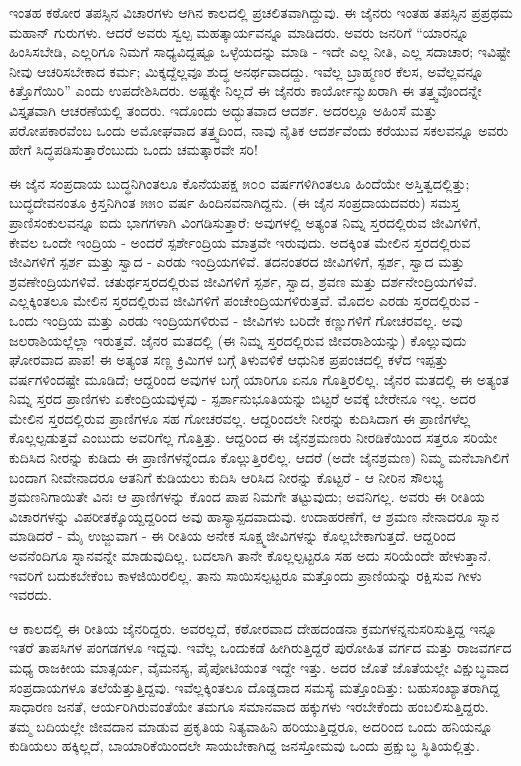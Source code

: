ಇಂತಹ ಕಠೋರ ತಪಸ್ಸಿನ ವಿಚಾರಗಳು ಆಗಿನ ಕಾಲದಲ್ಲಿ ಪ್ರಚಲಿತವಾಗಿದ್ದುವು. ಈ ಜೈನರು ಇಂತಹ ತಪಸ್ಸಿನ ಪ್ರಪ್ರಥಮ ಮಹಾನ್ ಗುರುಗಳು. ಆದರೆ ಅವರು ಸ್ವಲ್ಪ ಮಹತ್ಕಾರ್ಯವನ್ನೂ ಮಾಡಿದರು. ಅವರು ಜನರಿಗೆ “ಯಾರನ್ನೂ ಹಿಂಸಿಸಬೇಡಿ, ಎಲ್ಲರಿಗೂ ನಿಮಗೆ ಸಾಧ್ಯವಿದ್ದಷ್ಟೂ ಒಳ್ಳೆಯದನ್ನು ಮಾಡಿ - ಇದೇ ಎಲ್ಲ ನೀತಿ, ಎಲ್ಲ ಸದಾಚಾರ; ಇವಿಷ್ಟೇ ನೀವು ಆಚರಿಸಬೇಕಾದ ಕರ್ಮ; ಮಿಕ್ಕದ್ದೆಲ್ಲವೂ ಶುದ್ಧ ಅನರ್ಥವಾದದ್ದು. ಇವೆಲ್ಲ ಬ್ರಾಹ್ಮಣರ ಕೆಲಸ, ಅವೆಲ್ಲವನ್ನೂ ಕಿತ್ತೊಗೆಯಿರಿ” ಎಂದು ಉಪದೇಶಿಸಿದರು. ಅಷ್ಟಕ್ಕೇ ನಿಲ್ಲದೆ ಈ ಜೈನರು ಕಾರ್ಯೋನ್ಮುಖರಾಗಿ ಈ ತತ್ತ್ವವೊಂದನ್ನೇ ವಿಸ್ತೃತವಾಗಿ ಆಚರಣೆಯಲ್ಲಿ ತಂದರು. ಇದೊಂದು ಅದ್ಭುತವಾದ ಆದರ್ಶ. ಅದರಲ್ಲೂ ಅಹಿಂಸೆ ಮತ್ತು ಪರೋಪಕಾರವೆಂಬ ಒಂದು ಅಮೋಘವಾದ ತತ್ತ್ವದಿಂದ, ನಾವು ನೈತಿಕ ಆದರ್ಶವೆಂದು ಕರೆಯುವ ಸಕಲವನ್ನೂ ಅವರು ಹೇಗೆ ಸಿದ್ಧಪಡಿಸುತ್ತಾರೆಂಬುದು ಒಂದು ಚಮತ್ಕಾರವೇ ಸರಿ!

ಈ ಜೈನ ಸಂಪ್ರದಾಯ ಬುದ್ಧನಿಗಿಂತಲೂ ಕೊನೆಯಪಕ್ಷ ೫೦೦ ವರ್ಷಗಳಿಗಿಂತಲೂ ಹಿಂದೆಯೇ ಅಸ್ತಿತ್ವದಲ್ಲಿತ್ತು; ಬುದ್ಧದೇವನಂತೂ ಕ್ರಿಸ್ತನಿಗಿಂತ ೫೫೦ ವರ್ಷ ಹಿಂದಿನವನಾಗಿದ್ದನು. (ಈ ಜೈನ ಸಂಪ್ರದಾಯದವರು) ಸಮಸ್ತ ಪ್ರಾಣಿಸಂಕುಲವನ್ನೂ ಐದು ಭಾಗಗಳಾಗಿ ವಿಂಗಡಿಸುತ್ತಾರೆ: ಅವುಗಳಲ್ಲಿ ಅತ್ಯಂತ ನಿಮ್ನ ಸ್ತರದಲ್ಲಿರುವ ಜೀವಿಗಳಿಗೆ, ಕೇವಲ ಒಂದೇ ಇಂದ್ರಿಯ - ಅಂದರೆ ಸ್ಪರ್ಶೇಂದ್ರಿಯ ಮಾತ್ರವೇ ಇರುವುದು. ಅದಕ್ಕಿಂತ ಮೇಲಿನ ಸ್ತರದಲ್ಲಿರುವ ಜೀವಿಗಳಿಗೆ ಸ್ಪರ್ಶ ಮತ್ತು ಸ್ವಾದ - ಎರಡು ಇಂದ್ರಿಯಗಳಿವೆ. ತದನಂತರದ ಜೀವಿಗಳಿಗೆ, ಸ್ಪರ್ಶ, ಸ್ವಾದ ಮತ್ತು ಶ್ರವಣೇಂದ್ರಿಯಗಳಿವೆ. ಚತುರ್ಥಸ್ತರದಲ್ಲಿರುವ ಜೀವಿಗಳಿಗೆ ಸ್ಪರ್ಶ, ಸ್ವಾದ, ಶ್ರವಣ ಮತ್ತು ದರ್ಶನೇಂದ್ರಿಯಗಳಿವೆ. ಎಲ್ಲಕ್ಕಿಂತಲೂ ಮೇಲಿನ ಸ್ತರದಲ್ಲಿರುವ ಜೀವಿಗಳಿಗೆ ಪಂಚೇಂದ್ರಿಯಗಳಿರುತ್ತವೆ. ಮೊದಲ ಎರಡು ಸ್ತರದಲ್ಲಿರುವ - ಒಂದು ಇಂದ್ರಿಯ ಮತ್ತು ಎರಡು ಇಂದ್ರಿಯಗಳಿರುವ - ಜೀವಿಗಳು ಬರಿದೇ ಕಣ್ಣುಗಳಿಗೆ ಗೋಚರವಲ್ಲ. ಅವು ಜಲರಾಶಿಯಲ್ಲೆಲ್ಲಾ ಇರುತ್ತವೆ. ಜೈನರ ಮತದಲ್ಲಿ (ಈ ನಿಮ್ನ ಸ್ತರದಲ್ಲಿರುವ ಜೀವರಾಶಿಯನ್ನು) ಕೊಲ್ಲುವುದು ಘೋರವಾದ ಪಾಪ! ಈ ಅತ್ಯಂತ ಸಣ್ಣ ಕ್ರಿಮಿಗಳ ಬಗ್ಗೆ ತಿಳುವಳಿಕೆ ಆಧುನಿಕ ಪ್ರಪಂಚದಲ್ಲಿ ಕಳೆದ ಇಪ್ಪತ್ತು ವರ್ಷಗಳಿಂದಷ್ಟೇ ಮೂಡಿದೆ; ಆದ್ದರಿಂದ ಅವುಗಳ ಬಗ್ಗೆ ಯಾರಿಗೂ ಏನೂ ಗೊತ್ತಿರಲಿಲ್ಲ. ಜೈನರ ಮತದಲ್ಲಿ ಈ ಅತ್ಯಂತ ನಿಮ್ನ ಸ್ತರದ ಪ್ರಾಣಿಗಳು ಏಕೇಂದ್ರಿಯವುಳ್ಳವು - ಸ್ಪರ್ಶಾನುಭೂತಿಯನ್ನು ಬಿಟ್ಟರೆ ಅವಕ್ಕೆ ಬೇರೇನೂ ಇಲ್ಲ. ಅದರ ಮೇಲಿನ ಸ್ತರದಲ್ಲಿರುವ ಪ್ರಾಣಿಗಳೂ ಸಹ ಗೋಚರವಲ್ಲ. ಆದ್ದರಿಂದಲೇ ನೀರನ್ನು ಕುದಿಸಿದಾಗ ಈ ಪ್ರಾಣಿಗಳೆಲ್ಲ ಕೊಲ್ಲಲ್ಪಡುತ್ತವೆ ಎಂಬುದು ಅವರಿಗೆಲ್ಲ ಗೊತ್ತಿತ್ತು. ಆದ್ದರಿಂದ ಈ ಜೈನಶ್ರಮಣರು ನೀರಡಿಕೆಯಿಂದ ಸತ್ತರೂ ಸರಿಯೇ ಕುದಿಸಿದ ನೀರನ್ನು ಕುಡಿದು ಈ ಪ್ರಾಣಿಗಳನ್ನೆಂದೂ ಕೊಲ್ಲುತ್ತಿರಲಿಲ್ಲ. ಆದರೆ (ಅದೇ ಜೈನಶ್ರಮಣ) ನಿಮ್ಮ ಮನೆಬಾಗಿಲಿಗೆ ಬಂದಾಗ ನೀವೇನಾದರೂ ಆತನಿಗೆ ಕುಡಿಯಲು ಕುದಿಸಿ ಆರಿಸಿದ ನೀರನ್ನು ಕೊಟ್ಟರೆ - ಆ ನೀರಿನ ಸೌಲಭ್ಯ ಶ್ರಮಣನಿಗಾಯಿತೇ ವಿನಃ ಆ ಪ್ರಾಣಿಗಳನ್ನು ಕೊಂದ ಪಾಪ ನಿಮಗೇ ತಟ್ಟುವುದು; ಅವನಿಗಲ್ಲ. ಅವರು ಈ ರೀತಿಯ ವಿಚಾರಗಳನ್ನು ವಿಪರೀತಕ್ಕೊಯ್ದದ್ದರಿಂದ ಅವು ಹಾಸ್ಯಾಸ್ಪದವಾದುವು. ಉದಾಹರಣೆಗೆ, ಆ ಶ್ರಮಣ ನೇನಾದರೂ ಸ್ನಾನ ಮಾಡಿದರೆ - ಮೈ ಉಜ್ಜುವಾಗ - ಈ ರೀತಿಯ ಅನೇಕ ಸೂಕ್ಷ್ಮಜೀವಿಗಳನ್ನು ಕೊಲ್ಲಬೇಕಾಗುತ್ತದೆ. ಆದ್ದರಿಂದ ಅವನೆಂದಿಗೂ ಸ್ನಾನವನ್ನೇ ಮಾಡುವುದಿಲ್ಲ. ಬದಲಾಗಿ ತಾನೇ ಕೊಲ್ಲಲ್ಪಟ್ಟರೂ ಸಹ ಅದು ಸರಿಯೆಂದೇ ಹೇಳುತ್ತಾನೆ. ಇವರಿಗೆ ಬದುಕಬೇಕೆಂಬ ಕಾಳಜಿಯಿರಲಿಲ್ಲ. ತಾನು ಸಾಯಿಸಲ್ಪಟ್ಟರೂ ಮತ್ತೊಂದು ಪ್ರಾಣಿಯನ್ನು ರಕ್ಷಿಸುವ ಗೀಳು ಇವರದು.

ಆ ಕಾಲದಲ್ಲಿ ಈ ರೀತಿಯ ಜೈನರಿದ್ದರು. ಅವರಲ್ಲದೆ, ಕಠೋರವಾದ ದೇಹದಂಡನಾ ಕ್ರಮಗಳನ್ನನುಸರಿಸುತ್ತಿದ್ದ ಇನ್ನೂ ಇತರೆ ತಾಪಸಿಗಳ ಪಂಗಡಗಳೂ ಇದ್ದವು. ಇವೆಲ್ಲ ಒಂದುಕಡೆ ಹೀಗಿರುತ್ತಿದ್ದರೆ ಪುರೋಹಿತ ವರ್ಗದ ಮತ್ತು ರಾಜವರ್ಗದ ಮಧ್ಯ ರಾಜಕೀಯ ಮಾತ್ಸರ್ಯ, ವೈಮನಸ್ಯ, ಪೈಪೋಟಿಯಂತ ಇದ್ದೇ ಇತ್ತು. ಅದರ ಜೊತೆ ಜೊತೆಯಲ್ಲೇ ವಿಕ್ಷುಬ್ಧವಾದ ಸಂಪ್ರದಾಯಗಳೂ ತಲೆಯೆತ್ತುತ್ತಿದ್ದವು. ಇವೆಲ್ಲಕ್ಕಿಂತಲೂ ದೊಡ್ಡದಾದ ಸಮಸ್ಯೆ ಮತ್ತೊಂದಿತ್ತು: ಬಹುಸಂಖ್ಯಾತರಾಗಿದ್ದ ಸಾಧಾರಣ ಜನತೆ, ಆರ್ಯರಿಗಿರುವಂತೆಯೇ ತಮಗೂ ಸಮಾನವಾದ ಹಕ್ಕುಗಳು ಇರಬೇಕೆಂದು ಹಂಬಲಿಸುತ್ತಿದ್ದರು. ತಮ್ಮ ಬದಿಯಲ್ಲೇ ಜೀವದಾನ ಮಾಡುವ ಪ್ರಕೃತಿಯ ನಿತ್ಯವಾಹಿನಿ ಹರಿಯುತ್ತಿದ್ದರೂ, ಅದರಿಂದ ಒಂದು ಹನಿಯನ್ನೂ ಕುಡಿಯಲು ಹಕ್ಕಿಲ್ಲದೆ, ಬಾಯಾರಿಕೆಯಿಂದಲೇ ಸಾಯಬೇಕಾಗಿದ್ದ ಜನಸ್ತೋಮವು ಒಂದು ಪ್ರಕ್ಷುಬ್ಧ ಸ್ಥಿತಿಯಲ್ಲಿತ್ತು.

